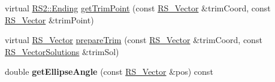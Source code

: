 \begin{DoxyCompactItemize}
\item 
virtual \hyperlink{classRS2_a30e80df2ef4bb36f4e89ea500eb212ab}{R\-S2\-::\-Ending} \hyperlink{classRS__Ellipse_acfb023a7e60667df5e96a930b3b3b478}{get\-Trim\-Point} (const \hyperlink{classRS__Vector}{R\-S\-\_\-\-Vector} \&trim\-Coord, const \hyperlink{classRS__Vector}{R\-S\-\_\-\-Vector} \&trim\-Point)
\item 
virtual \hyperlink{classRS__Vector}{R\-S\-\_\-\-Vector} \hyperlink{classRS__Ellipse_acb94ce93f1125c91d29919a5c4d4016f}{prepare\-Trim} (const \hyperlink{classRS__Vector}{R\-S\-\_\-\-Vector} \&trim\-Coord, const \hyperlink{classRS__VectorSolutions}{R\-S\-\_\-\-Vector\-Solutions} \&trim\-Sol)
\item 
\hypertarget{classRS__Ellipse_ad4df44321bf0e7e353d134c2dcc8d573}{double {\bfseries get\-Ellipse\-Angle} (const \hyperlink{classRS__Vector}{R\-S\-\_\-\-Vector} \&pos) const }\label{classRS__Ellipse_ad4df44321bf0e7e353d134c2dcc8d573}


\end{DoxyCompactItemize}
